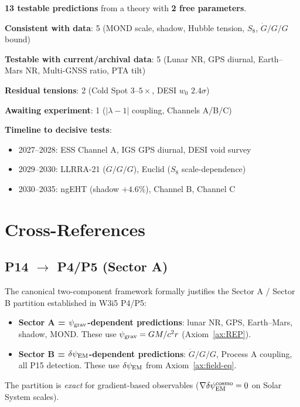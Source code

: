 \documentclass[11pt]{article}
\newcommand{\psigrav}{\psi_{\rm grav}}
\newcommand{\dpsiEM}{\delta\psi_{\rm EM}}
\newcommand{\Gdot}{\dot{G}/G}
\newcommand{\lamdiff}{|\lambda{-}1|}
\begin{document}
\begin{tcolorbox}[colback=green!5!white, colframe=green!60!black,
  title=\textbf{Canonical DFD Prediction Scorecard}]

\textbf{13 testable predictions} from a theory with \textbf{2 free parameters}.

\textbf{Consistent with data}: 5 (MOND scale, shadow, Hubble tension,
$S_8$, $\Gdot/G$ bound)

\textbf{Testable with current/archival data}: 5 (Lunar NR, GPS diurnal,
Earth--Mars NR, Multi-GNSS ratio, PTA tilt)

\textbf{Residual tensions}: 2 (Cold Spot $3$--$5\times$, DESI $w_0$
$2.4\sigma$)

\textbf{Awaiting experiment}: 1 ($\lamdiff$ coupling, Channels A/B/C)

\textbf{Timeline to decisive tests}:
\begin{itemize}[nosep]
\item 2027--2028: ESS Channel A, IGS GPS diurnal, DESI void survey
\item 2029--2030: LLRRA-21 ($\Gdot/G$), Euclid ($S_8$ scale-dependence)
\item 2030--2035: ngEHT (shadow $+4.6\%$), Channel B, Channel C
\end{itemize}
\end{tcolorbox}

\section{Cross-References}
\label{sec:crossrefs}

\subsection{P14 $\to$ P4/P5 (Sector A)}

The canonical two-component framework formally justifies the Sector A / Sector B
partition established in W3i5 P4/P5:
\begin{itemize}[nosep]
\item \textbf{Sector A = $\psigrav$-dependent predictions}: lunar NR,
  GPS, Earth--Mars, shadow, MOND. These use $\psigrav = GM/c^2r$
  (Axiom~\ref{ax:REP}).
\item \textbf{Sector B = $\dpsiEM$-dependent predictions}: $\Gdot/G$,
  Process A coupling, all P15 detection. These use $\dpsiEM$ from
  Axiom~\ref{ax:field-eq}.
\end{itemize}
The partition is \emph{exact} for gradient-based observables
($\nabla\dpsiEM^{\rm cosmo} = 0$ on Solar System scales).
\end{document}
